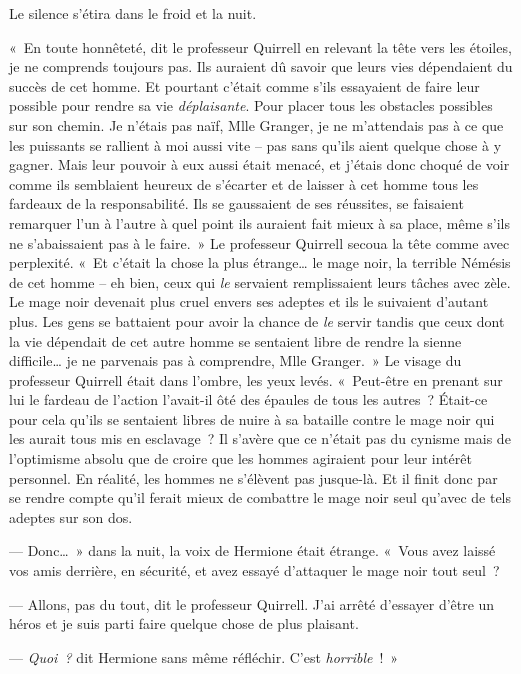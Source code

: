 Le silence s'étira dans le froid et la nuit.

«~En toute honnêteté, dit le professeur Quirrell en relevant la tête vers les étoiles, je ne comprends toujours pas. Ils auraient dû savoir que leurs vies dépendaient du succès de cet homme. Et pourtant c'était comme s'ils essayaient de faire leur possible pour rendre sa vie \emph{déplaisante}. Pour placer tous les obstacles possibles sur son chemin. Je n'étais pas naïf, Mlle Granger, je ne m'attendais pas à ce que les puissants se rallient à moi aussi vite -- pas sans qu'ils aient quelque chose à y gagner. Mais leur pouvoir à eux aussi était menacé, et j'étais donc choqué de voir comme ils semblaient heureux de s'écarter et de laisser à cet homme tous les fardeaux de la responsabilité. Ils se gaussaient de ses réussites, se faisaient remarquer l'un à l'autre à quel point ils auraient fait mieux à sa place, même s'ils ne s'abaissaient pas à le faire.~» Le professeur Quirrell secoua la tête comme avec perplexité. «~Et c'était la chose la plus étrange… le mage noir, la terrible Némésis de cet homme -- eh bien, ceux qui \emph{le} servaient remplissaient leurs tâches avec zèle. Le mage noir devenait plus cruel envers ses adeptes et ils le suivaient d'autant plus. Les gens se battaient pour avoir la chance de \emph{le} servir tandis que ceux dont la vie dépendait de cet autre homme se sentaient libre de rendre la sienne difficile… je ne parvenais pas à comprendre, Mlle Granger.~» Le visage du professeur Quirrell était dans l'ombre, les yeux levés. «~Peut-être en prenant sur lui le fardeau de l'action l'avait-il ôté des épaules de tous les autres~? Était-ce pour cela qu'ils se sentaient libres de nuire à sa bataille contre le mage noir qui les aurait tous mis en esclavage~? Il s'avère que ce n'était pas du cynisme mais de l'optimisme absolu que de croire que les hommes agiraient pour leur intérêt personnel. En réalité, les hommes ne s'élèvent pas jusque-là. Et il finit donc par se rendre compte qu'il ferait mieux de combattre le mage noir seul qu'avec de tels adeptes sur son dos.

--- Donc…~» dans la nuit, la voix de Hermione était étrange. «~Vous avez laissé vos amis derrière, en sécurité, et avez essayé d'attaquer le mage noir tout seul~?

--- Allons, pas du tout, dit le professeur Quirrell. J'ai arrêté d'essayer d'être un héros et je suis parti faire quelque chose de plus plaisant.

--- \emph{Quoi~?} dit Hermione sans même réfléchir. C'est \emph{horrible}~!~»

